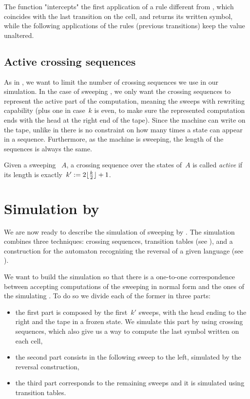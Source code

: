 The function "intercepts" the first application of a rule different from , which coincides with the last transition on the cell, and returns its written symbol, while the following applications of the rules (previous transitions) keep the value unaltered.


\subsection{Active crossing sequences}
As in \TDFAs, we want to limit the number of crossing sequences we use in our simulation.
In the case of sweeping \kDLAs, we only want the crossing sequences to represent the active part of the computation, meaning the sweeps with rewriting capability (plus one in case~$k$ is even, to make sure the represented computation ends with the head at the right end of the tape).
Since the machine can write on the tape, unlike in \TDFAs there is no constraint on how many times a state can appear in a sequence. Furthermore, as the machine is sweeping, the length of the sequences is always the same.
\begin{defn}
	Given a sweeping \kLA~$A$, a crossing sequence over the states of~$A$ is called \emph{active} if its length is exactly~$k':=2\lfloor \frac{k}{2} \rfloor+1$.
\end{defn}



\section{Simulation by \texorpdfstring{\ONFAs}{1NFAs}}\label{sec:swkdla-to-NFA}
We are now ready to describe the simulation of sweeping \kDLAs by \ONFAs.
The simulation combines three techniques: crossing sequences, transition tables (see ), and a construction for the automaton recognizing the reversal of a given language (see ).

We want to build the simulation so that there is a one-to-one correspondence between accepting computations of the sweeping \kDLA in normal form and the ones of the simulating \ONFA.
To do so we divide each of the former in three parts:
\begin{itemize}
	\item the first part is composed by the first~$k'$ sweeps, with the head ending to the right and the tape in a frozen state. We simulate this part by using crossing sequences, which also give us a way to compute the last symbol written on each cell,
	\item the second part consists in the following sweep to the left, simulated by the reversal construction,
	\item the third part corresponds to the remaining sweeps and it is simulated using transition tables.
\end{itemize}

